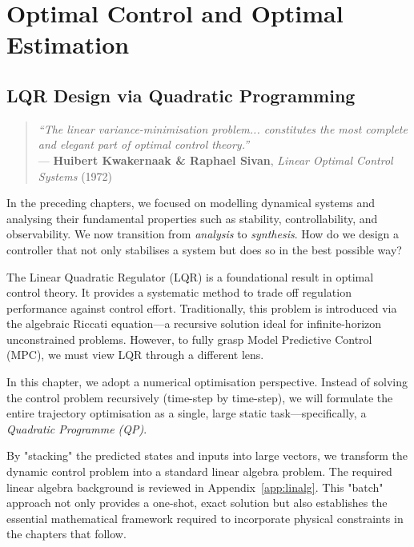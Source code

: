 \part{Optimal Control and Optimal Estimation}



\chapter{LQR Design via Quadratic Programming}
\label{chap:lqr}

\begin{quote}
	\textit{``The linear variance-minimisation problem... constitutes the most complete and elegant part of optimal control theory.''} \\
	
	\hfill --- \textbf{Huibert Kwakernaak \& Raphael Sivan}, \textit{Linear Optimal Control Systems} (1972)
\end{quote}

In the preceding chapters, we focused on modelling dynamical systems and analysing their fundamental properties such as stability, controllability, and observability. We now transition from \textit{analysis} to \textit{synthesis}. How do we design a controller that not only stabilises a system but does so in the best possible way?

The Linear Quadratic Regulator (LQR) is a foundational result in optimal control theory. It provides a systematic method to trade off regulation performance against control effort. Traditionally, this problem is introduced via the algebraic Riccati equation—a recursive solution ideal for infinite-horizon unconstrained problems. However, to fully grasp Model Predictive Control (MPC), we must view LQR through a different lens.

In this chapter, we adopt a numerical optimisation perspective. Instead of solving the control problem recursively (time-step by time-step), we will formulate the entire trajectory optimisation as a single, large static task—specifically, a \emph{Quadratic Programme (QP)}.

By "stacking" the predicted states and inputs into large vectors, we transform the dynamic control problem into a standard linear algebra problem. The required linear algebra background is reviewed in Appendix~\ref{app:linalg}. This "batch" approach not only provides a one-shot, exact solution but also establishes the essential mathematical framework required to incorporate physical constraints in the chapters that follow.

